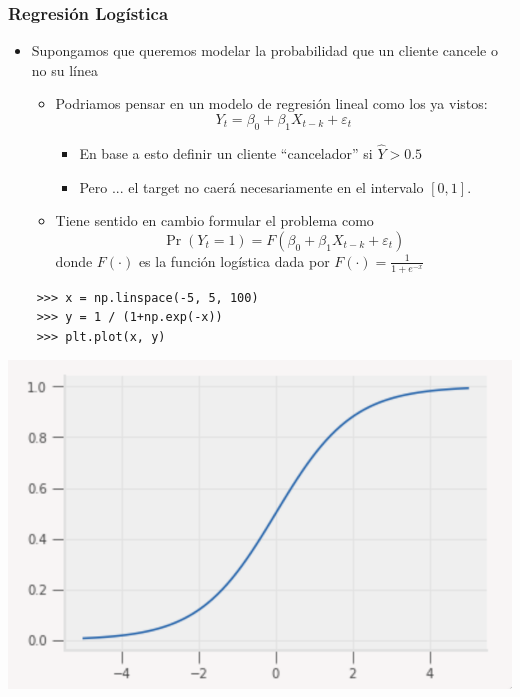 \documentclass[leqno, 10pt, envcountsect]{beamer}
\numberwithin{equation}{section}
\theoremstyle{definition}
\theoremstyle{example}
\numberwithin{figure}{section}
\numberwithin{table}{section}
\let\olditem\item
\renewcommand{\item}{%
\olditem\vspace{1pt}}
\begin{document}
\begin{frame}[fragile]
  \frametitle{Regresión Logística}
  \begin{itemize}
    \item Supongamos que queremos modelar la probabilidad que un cliente cancele
      o no su línea
    \begin{itemize}
      \item Podriamos pensar en un modelo de regresión lineal como los ya
        vistos:
        \begin{equation*}
          Y_{t} = \beta_{0} + \beta_{1}X_{t-k} + \varepsilon_{t}
        \end{equation*}
        \begin{itemize}
          \item En base a esto definir un cliente \enquote{cancelador} si $\hat{Y} > 0.5$
          \item Pero ... el target no caerá necesariamente en el intervalo $[0,1]$.
        \end{itemize}
      \item Tiene sentido en cambio formular el problema como
      \begin{equation*}
        \Pr(Y_{t} = 1) = F(\beta_{0} + \beta_{1}X_{t-k} + \varepsilon_{t})
      \end{equation*}
      donde $F(\cdot)$ es la función logística dada por $F(\cdot) = \frac{1}{1 + e^{-x}}$
    \end{itemize}
  \end{itemize}
    \begin{verbatim}
    >>> x = np.linspace(-5, 5, 100)
    >>> y = 1 / (1+np.exp(-x))
    >>> plt.plot(x, y)
    \end{verbatim}
    \begin{center}
      \includegraphics[scale=0.15]{logistic.png}
    \end{center}
\end{frame}
\end{document}
